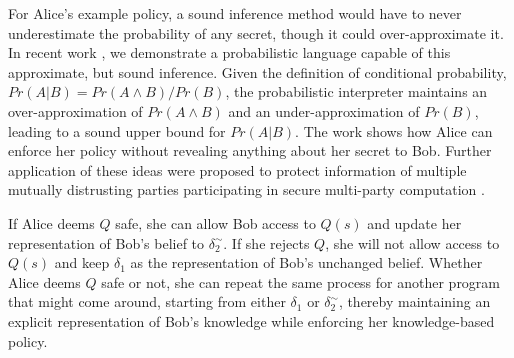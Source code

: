 \documentclass{article} %
\newcommand{\pxm}[1]{\textcolor{red}{PM -- #1}}
\newcommand{\rsecret}[0]{s}
\newcommand{\sconst}[1]{\ensuremath{\mathsf{#1}}}
\newcommand{\strue}{\sconst{True}}
\newcommand{\sfalse}{\sconst{False}}
\newcommand{\paren}[1]{\left( #1 \right)}
\newcommand{\acond}[0]{|^\sim}
\newcommand{\stacklabel}[1]{\stackrel{\smash{\scriptscriptstyle \mathrm{#1}}}}
\newcommand{\defeq}{\stacklabel{def}=}
\theoremstyle{plain} %
\theoremstyle{definition} %
\begin{document}
For Alice's example policy, a sound inference method would have to
never underestimate the probability of any secret, though it could
over-approximate it. In recent work \cite{mardziel11belief}, we
demonstrate a probabilistic language capable of this approximate, but
sound inference. Given the definition of conditional probability, $
Pr(A | B) = Pr(A \wedge B) / Pr(B) $, the probabilistic interpreter
maintains an over-approximation of $ Pr(A \wedge B) $ and an
under-approximation of $ Pr(B) $, leading to a sound upper bound for $
Pr(A | B) $. The work shows how Alice can enforce her policy
without revealing anything about her secret to Bob. Further application
of these ideas were proposed to protect information of multiple
mutually distrusting parties participating in secure multi-party
computation \cite{mardziel12smc}.

%
%

%

If Alice deems $ Q $ safe, she can allow Bob access to $ Q(\rsecret) $
and update her representation of Bob's belief to $ \delta_2^\sim $. If
she rejects $ Q $, she will not allow access to $ Q(\rsecret) $ and
keep $ \delta_1 $ as the representation of Bob's unchanged
belief. Whether Alice deems $ Q $ safe or not, she can repeat the same
process for another program that might come around, starting from
either $ \delta_1 $ or $ \delta_2^\sim $, thereby maintaining an
explicit representation of Bob's knowledge while enforcing her
knowledge-based policy.
\end{document}
